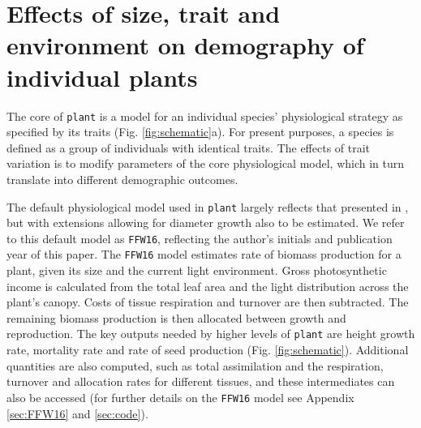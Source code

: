 \documentclass[a4paper,11pt]{article}
\newcommand{\plant}{\texttt{plant}}
\begin{document}
\section{Effects of size, trait and environment on demography of individual plants}

The core of {\plant} is a model for an individual species' physiological
strategy as specified by its traits (Fig. \ref{fig:schematic}a). For
present purposes, a species is defined as a group of individuals with identical
traits. The effects of trait variation is to modify parameters of the core
physiological model, which in turn translate into different demographic outcomes.

The default physiological model used in {\plant} largely reflects
that presented in \citet{Falster-2011,Falster-2015}, but with extensions
allowing for diameter growth also to be estimated. We refer to this
default model as \texttt{FFW16}, reflecting the author's initials and
publication year of this paper. The \texttt{FFW16} model estimates rate
of biomass
production for a plant, given its size and the current light
environment. Gross photosynthetic income is calculated from the total
leaf area and the light distribution across the plant's canopy. Costs
of tissue respiration and turnover are then subtracted. The remaining
biomass production is then allocated between growth and reproduction. The key
outputs needed by higher levels of {\plant} are height
growth rate, mortality rate and rate of seed production (Fig. \ref{fig:schematic}).  Additional quantities are also computed, such as total assimilation
and the respiration, turnover and allocation rates for different
tissues, and these intermediates can also be accessed (for further details on the \texttt{FFW16} model see Appendix
\ref{sec:FFW16} and \ref{sec:code}).
\end{document}
